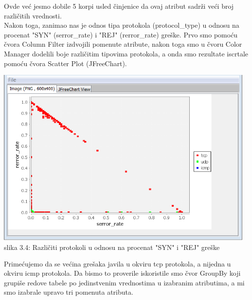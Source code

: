 \documentclass[10pt]{article}
\begin{document}
Ovde ve\' c jesmo dobile 5 korpi usled \v cinjenice da ovaj atribut sadr\v zi ve\' ci broj razli\v citih vrednosti.\\
Nakon toga, zanimao nas je odnos tipa protokola (protocol\_type) u odnosu na procenat "SYN" (serror\_rate) i "REJ" (rerror\_rate) gre\v ske. Prvo smo pomo\' cu \v cvora Column Filter izdvojili pomenute atribute, nakon toga smo u \v cvoru Color Manager dodelili boje razli\v citim tipovima protokola, a onda smo rezultate iscrtale pomo\' cu \v cvora Scatter Plot (JFreeChart).

\begin{center}
\includegraphics[width = \textwidth,  height = 9cm]{vizuelizacija4_nova}
slika 3.4: Razli\v citi protokoli u odnosu na procenat "SYN" i "REJ" gre\v ske\\
\end{center}

Prime\' cujemo da se ve\' cina gre\v saka javila u okviru tcp protokola, a nijedna u okviru icmp protokola. Da bismo to proverile iskoristile smo \v cvor GroupBy koji grupi\v se redove tabele po jedinstvenim vrednostima u izabranim atributima, a mi smo izabrale upravo tri pomenuta atributa.
\end{document}
